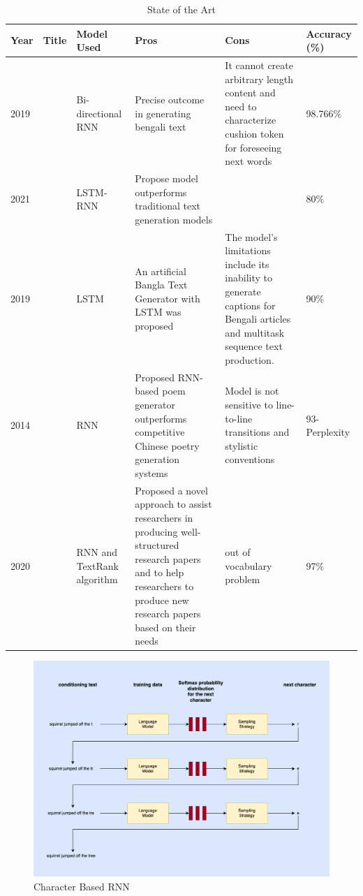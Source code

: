 \documentclass[conference]{IEEEtran}
\begin{document}
\begin{table}[htbp]
\caption{State of the Art}
\begin{center}
\begin{tabular}{|p{1cm}|p{2cm}|p{3cm}|p{3cm}|p{3cm}|p{1cm}|}
\hline
\textbf{Year} & \textbf{Title} & \textbf{Model Used} & \textbf{Pros} & \textbf{Cons} & \textbf{Accuracy (\%)} \\
\hline
 2019  & \cite{abujar2019bengali} & Bi-directional RNN & Precise outcome in generating bengali text & It cannot create arbitrary length content and need to characterize cushion token for foreseeing next 
words & 98.766\% \\
\hline
 2021 & \cite{buddana2021word} & LSTM-RNN   & Propose model outperforms traditional text generation models &  & 80\% \\
\hline
2019 & \cite{islam2019sequence} & LSTM & An artificial Bangla Text Generator with LSTM was proposed  &The model's limitations include its inability to generate captions for Bengali articles and multitask sequence text production. & 90\% \\
\hline
2014 & \cite{zhang2014chinese} & RNN & Proposed RNN-based
poem generator outperforms competitive Chinese poetry generation systems & Model is not  sensitive to line-to-line transitions and
stylistic conventions & 93- Perplexity \\
\hline
2020 & \cite{wang2020automatic} & RNN and TextRank algorithm & Proposed a novel approach to assist researchers in producing well-structured research papers and to help researchers to produce new research papers based on their needs & out of vocabulary 
problem & 97\% \\
\hline

\end{tabular}
\end{center}
\label{table:state_of_the_art}
\end{table}


\begin{figure}
    \centering
    \includegraphics[width=1\textwidth]{p1.jpg}
    \caption{Character Based RNN}
    \label{fig:example}
\end{figure}
\end{document}
